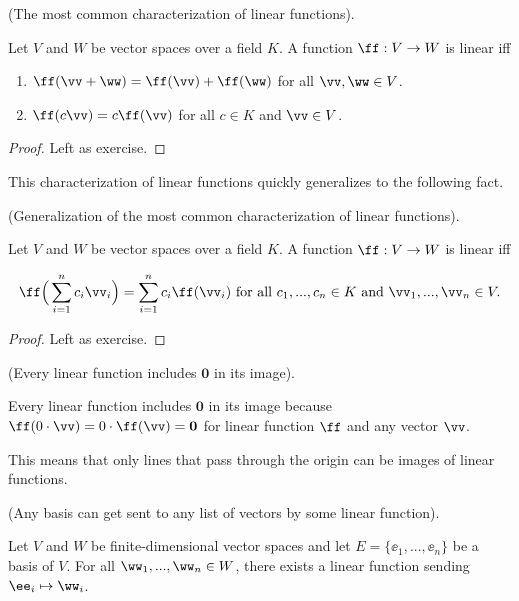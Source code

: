 \begin{theorem}
    (The most common characterization of linear functions).
    
    Let $V$ and $W$ be vector spaces over a field $K$. A function $\ff:V \rightarrow W$ is linear iff
    
    \begin{enumerate}
        \item $\ff(\vv + \ww) = \ff(\vv) + \ff(\ww)$ for all $\vv, \ww \in V$.
        \item $\ff(c\vv) = c\ff(\vv)$ for all $c \in K$ and $\vv \in V$.
    \end{enumerate}
\end{theorem}

\begin{proof}
   Left as exercise.
\end{proof}

This characterization of linear functions quickly generalizes to the following fact.

\begin{theorem}
    (Generalization of the most common characterization of linear functions).
    
    Let $V$ and $W$ be vector spaces over a field $K$. A function $\ff:V \rightarrow W$ is linear iff
    
    \begin{align*}
        \ff \Big(\sum_{i = 1}^n c_i \vv_i \Big) = \sum_{i = 1}^n c_i \ff(\vv_i) \text{ for all } c_1, ..., c_n \in K \text{ and } \vv_1, ..., \vv_n \in V.
    \end{align*}
\end{theorem}

\begin{proof}
    Left as exercise.
\end{proof}

\begin{theorem}
    \label{ch::lin_alg::thm::linear_functions_have_zero_in_image}
    (Every linear function includes $\mathbf{0}$ in its image).
    
    Every linear function includes $\mathbf{0}$ in its image because $\ff(0 \cdot \vv) = 0 \cdot \ff(\vv) = \mathbf{0}$ for linear function $\ff$ and any vector $\vv$.
    
    This means that only lines that pass through the origin can be images of linear functions.
\end{theorem}

\begin{theorem}
\label{ch::lin_alg::thm::basis_sent_to_any_ordered_list}
    (Any basis can get sent to any list of vectors by some linear function).
    
    Let $V$ and $W$ be finite-dimensional vector spaces and let $E = \{\ee_1, ..., \ee_n\}$ be a basis of $V$. For all ${\ww_1, ..., \ww_n \in W}$, there exists a linear function sending $\ee_i \mapsto \ww_i$.
\end{theorem}

